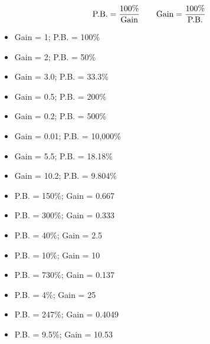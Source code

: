 
$$\hbox{P.B.} = {100\% \over \hbox{Gain}} \qquad \hbox{Gain} = {100\% \over \hbox{P.B.}}$$

\begin{itemize}
\item{}Gain = 1; P.B. = 100\%
\vskip 5pt
\item{}Gain = 2; P.B. = 50\%
\vskip 5pt
\item{}Gain = 3.0; P.B. = 33.3\%
\vskip 5pt
\item{}Gain = 0.5; P.B. = 200\%
\vskip 5pt
\item{}Gain = 0.2; P.B. = 500\%
\vskip 5pt
\item{}Gain = 0.01; P.B. = 10,000\%
\vskip 5pt
\item{}Gain = 5.5; P.B. = 18.18\%
\vskip 5pt
\item{}Gain = 10.2; P.B. = 9.804\%
\end{itemize} 



\begin{itemize}
\item{}P.B. = 150\%; Gain = 0.667
\vskip 5pt
\item{}P.B. = 300\%; Gain = 0.333
\vskip 5pt
\item{}P.B. = 40\%; Gain = 2.5
\vskip 5pt
\item{}P.B. = 10\%; Gain = 10
\vskip 5pt
\item{}P.B. = 730\%; Gain = 0.137
\vskip 5pt
\item{}P.B. = 4\%; Gain = 25
\vskip 5pt
\item{}P.B. = 247\%; Gain = 0.4049
\vskip 5pt
\item{}P.B. = 9.5\%; Gain = 10.53
\end{itemize} 











